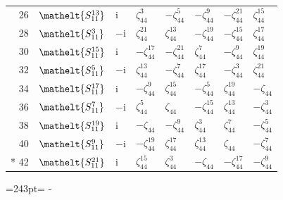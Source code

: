 \documentclass[10pt,a4paper]{article}
\newcommand{\needspace}[1]{\par\penalty-100\begingroup\dimen0=#1\relax\dimen2=\pagegoal
  \advance\dimen2-\pagetotal\ifdim\dimen0>\dimen2\relax\ifdim\dimen2>0pt\vfil\break\fi\fi
  \endgroup}
\numberwithin{equation}{section}
\newcommand{\eltfont}[1]{{\let\sigma\eltsigma\mathelt{#1}}}
\newcommand{\cls}[1]{\eltfont{#1}}
\newcommand{\iunit}{\mathrm{i}}
\newcommand{\rootunity}[1]{\zeta_{#1}}
\begin{document}
{\begin{longtable}{@{}rlllllll@{}}
26 & $\cls{S_{11}^{13}}$ & $\iunit{}$ & $\rootunity{44}^{3}$ & $-\rootunity{44}^{5}$ & $-\rootunity{44}^{9}$ & $-\rootunity{44}^{21}$ & $\rootunity{44}^{15}$\\
28 & $\cls{S_{11}^{3}}$ & $-\iunit{}$ & $\rootunity{44}^{21}$ & $\rootunity{44}^{13}$ & $-\rootunity{44}^{19}$ & $-\rootunity{44}^{15}$ & $\rootunity{44}^{17}$\\
30 & $\cls{S_{11}^{15}}$ & $\iunit{}$ & $-\rootunity{44}^{17}$ & $-\rootunity{44}^{21}$ & $\rootunity{44}^{7}$ & $-\rootunity{44}^{9}$ & $\rootunity{44}^{19}$\\
32 & $\cls{S_{11}^{5}}$ & $-\iunit{}$ & $\rootunity{44}^{13}$ & $-\rootunity{44}^{7}$ & $\rootunity{44}^{17}$ & $-\rootunity{44}^{3}$ & $\rootunity{44}^{21}$\\
34 & $\cls{S_{11}^{17}}$ & $\iunit{}$ & $-\rootunity{44}^{9}$ & $\rootunity{44}^{15}$ & $-\rootunity{44}^{5}$ & $\rootunity{44}^{19}$ & $-\rootunity{44}$\\
36 & $\cls{S_{11}^{7}}$ & $-\iunit{}$ & $\rootunity{44}^{5}$ & $\rootunity{44}$ & $-\rootunity{44}^{15}$ & $\rootunity{44}^{13}$ & $-\rootunity{44}^{3}$\\
38 & $\cls{S_{11}^{19}}$ & $\iunit{}$ & $-\rootunity{44}$ & $-\rootunity{44}^{9}$ & $\rootunity{44}^{3}$ & $\rootunity{44}^{7}$ & $-\rootunity{44}^{5}$\\
40 & $\cls{S_{11}^{9}}$ & $-\iunit{}$ & $-\rootunity{44}^{19}$ & $\rootunity{44}^{17}$ & $\rootunity{44}^{13}$ & $\rootunity{44}$ & $-\rootunity{44}^{7}$\\*
42 & $\cls{S_{11}^{21}}$ & $\iunit{}$ & $\rootunity{44}^{15}$ & $\rootunity{44}^{3}$ & $-\rootunity{44}$ & $-\rootunity{44}^{17}$ & $-\rootunity{44}^{9}$\\
\bottomrule\end{longtable}}
\needspace{243pt}
\end{document}
